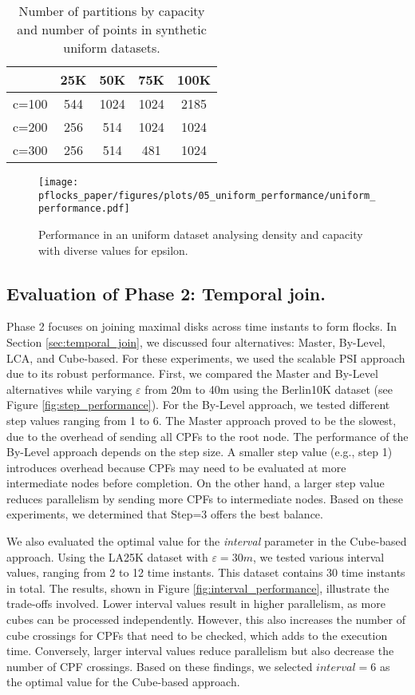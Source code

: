 \begin{table}
    \centering
    \caption{Number of partitions by capacity and number of points in synthetic uniform datasets.}
    \label{tab:uniform_ncells}
    \begin{tabular}{c|cccc}
              & 25K & 50K  & 75K  & 100K \\
        \hline
        c=100 & 544 & 1024 & 1024 & 2185 \\
        c=200 & 256 & 514  & 1024 & 1024 \\
        c=300 & 256 & 514  & 481  & 1024 \\
    \end{tabular}
\end{table}

\begin{figure}
    \centering
    \texttt{[image: pflocks\_paper/figures/plots/05\_uniform\_performance/uniform\_performance.pdf]}
    \caption{Performance in an uniform dataset analysing density and capacity with diverse values for epsilon.}\label{fig:uniform_performance}
\end{figure}

\subsection{Evaluation of Phase 2: Temporal join.}
Phase 2 focuses on joining maximal disks across time instants to form flocks. In Section \ref{sec:temporal_join}, we discussed four alternatives: Master, By-Level, LCA, and Cube-based. For these experiments, we used the scalable PSI approach due to its robust performance.
First, we compared the Master and By-Level alternatives while varying $\varepsilon$ from 20m to 40m using the Berlin10K dataset (see Figure \ref{fig:step_performance}). For the By-Level approach, we tested different step values ranging from 1 to 6. The Master approach proved to be the slowest, due to the overhead of sending all CPFs to the root node. The performance of the By-Level approach depends on the step size. A smaller step value (e.g., step 1) introduces overhead because CPFs may need to be evaluated at more intermediate nodes before completion. On the other hand, a larger step value reduces parallelism by sending more CPFs to intermediate nodes. Based on these experiments, we determined that Step=3 offers the best balance.

We also evaluated the optimal value for the \textit{interval} parameter in the Cube-based approach. Using the LA25K dataset with $\varepsilon=30m$, we tested various interval values, ranging from 2 to 12 time instants. This dataset contains 30 time instants in total. The results, shown in Figure \ref{fig:interval_performance}, illustrate the trade-offs involved. Lower interval values result in higher parallelism, as more cubes can be processed independently. However, this also increases the number of cube crossings for CPFs that need to be checked, which adds to the execution time. Conversely, larger interval values reduce parallelism but also decrease the number of CPF crossings. Based on these findings, we selected $interval=6$ as the optimal value for the Cube-based approach.

